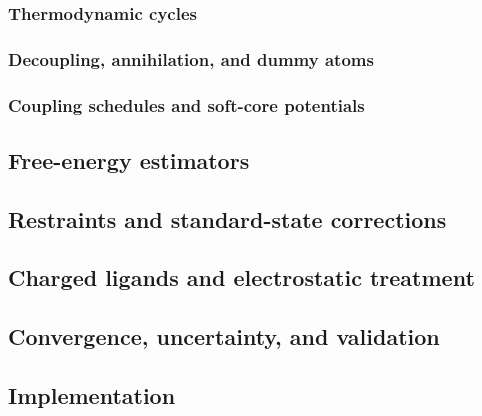 \lipsum[1][1-3]

\subsubsection{Thermodynamic cycles}
\lipsum[1][1-3]

\subsubsection{Decoupling, annihilation, and dummy atoms}
\lipsum[1][1-3]

\subsubsection{Coupling schedules and soft-core potentials}
\lipsum[1][1-3]

\subsection{Free-energy estimators}
\lipsum[1][1-3]

\subsection{Restraints and standard-state corrections}
\lipsum[1][1-3]

\subsection{Charged ligands and electrostatic treatment}
\lipsum[1][1-3]

\subsection{Convergence, uncertainty, and validation}
\lipsum[1][1-3]

\subsection{Implementation}



